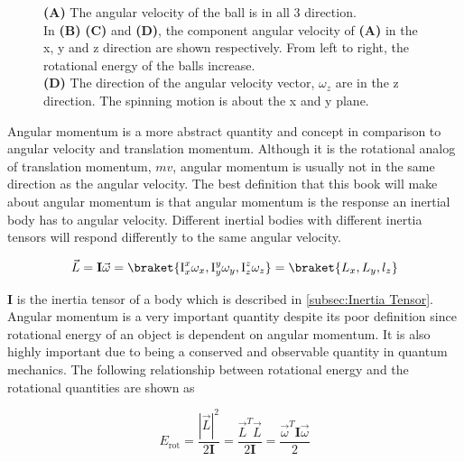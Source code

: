 \documentclass[11pt,a4paper]{book}
\newcommand{\imginput}[1]{} %
\begin{document}
			\begin{figure} [!ht]
				\centering
				\def\svgwidth{\columnwidth}
				\resizebox{16cm}{!}{\imginput{images/angular-velocity-momentum.pdf_tex}}
				\caption{\textbf{(A)} The angular velocity of the ball is in all 3 direction. \\
				In \textbf{(B)} \textbf{(C)} and \textbf{(D)}, the component angular velocity of \textbf{(A)} in the x, y and z direction are shown respectively. From left to right, the rotational energy of the balls increase. \\
				\textbf{(D)} The direction of the angular velocity vector, $\omega_z$ are in the z direction. The spinning motion is about the x and y plane.
					}
				\label{fig:angular-velocity-momentum}
			\end{figure}	
					
			Angular momentum is a more abstract quantity and concept in comparison to angular velocity and translation momentum. Although it is the rotational analog of translation momentum, $mv$, angular momentum is usually not in the same direction as the angular velocity. The best definition that this book will make about angular momentum is that angular momentum is the response an inertial body has to angular velocity. Different inertial bodies with different inertia tensors will respond differently to the same angular velocity.
			
			\begin{equation}
				\label{eq:angular momentum}
				\vec{L}=\textbf{I}\vec{\omega}
				=\braket{\text{I}_{x}^x\omega_x,\text{I}_{y}^y\omega_y,\text{I}_{z}^z\omega_z}=\braket{L_x,L_y,l_z}
			\end{equation}
			
			$\textbf{I}$ is the inertia tensor of a body which is described in \autoref{subsec:Inertia Tensor}. Angular momentum is a very important quantity despite its poor definition since rotational energy of an object is dependent on angular momentum. It is also highly important due to being a conserved and observable quantity in quantum mechanics. The following relationship between rotational energy and the rotational quantities are shown as
			
			\begin{equation}
				\label{eq:rotational energy classical}
				E_{\text{rot}} = \dfrac{|\vec{L}|^2}{2\textbf{I}} = \dfrac{\vec{L}^T \vec{L}}{2\textbf{I}} = \dfrac{\vec{\omega}^T\textbf{I}\vec{\omega}}{2}
			\end{equation}
			
\end{document}
